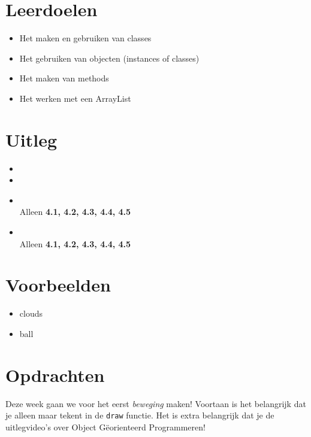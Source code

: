 \documentclass{../qh_exercise}
\begin{document}
\section{Leerdoelen}
\begin{itemize}
    \item Het maken en gebruiken van classes
    \item Het gebruiken van objecten (instances of classes)
    \item Het maken van methods
    \item Het werken met een ArrayList
\end{itemize}

\section{Uitleg}
\begin{itemize}
    \item {}
    \item {}
    \item {}\\
    Alleen \textbf{4.1, 4.2, 4.3, 4.4, 4.5}
    \item {}\\
    Alleen \textbf{4.1, 4.2, 4.3, 4.4, 4.5}\\
\end{itemize}

\section{Voorbeelden}
\begin{itemize}
    \item clouds
    \item ball
\end{itemize}

\newpage
\section{Opdrachten}
Deze week gaan we voor het eerst \textit{beweging} maken! Voortaan is het belangrijk dat je alleen maar tekent in de \texttt{draw} functie. Het is extra belangrijk dat je de uitlegvideo's over Object G\"eorienteerd Programmeren!
\end{document}
